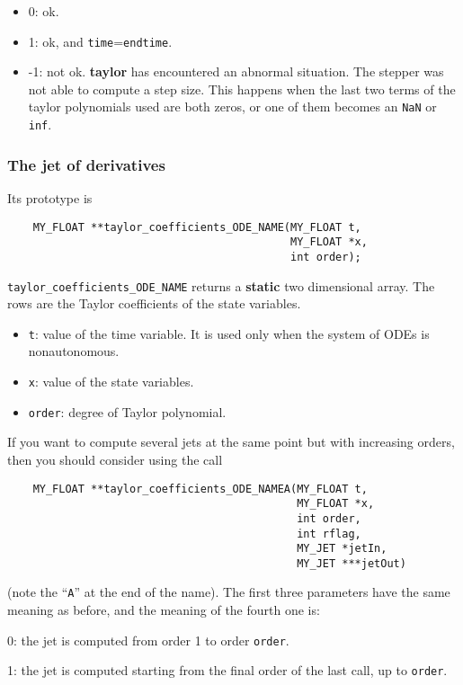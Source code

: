 \documentclass[10pt]{article}
\theoremstyle{remark}
\newcommand{\taylorname}{{\bf taylor}}
\begin{document}
\begin{itemize}
\item 0: ok.
\item 1: ok, and {\tt time}={\tt endtime}.
\item -1: not ok. \taylorname{} has encountered an abnormal situation. The stepper was not able to compute a step size. This happens when the last two terms of the taylor polynomials used are both zeros, or one of them becomes an \verb+NaN+ or \verb+inf+.
\end{itemize}


\subsubsection*{The jet of derivatives}
Its prototype is
\begin{verbatim}
    MY_FLOAT **taylor_coefficients_ODE_NAME(MY_FLOAT t,
                                            MY_FLOAT *x,
                                            int order);
\end{verbatim}
\verb+taylor_coefficients_ODE_NAME+ returns a {\bf static} two
dimensional array. The rows are the Taylor coefficients of the state
variables.

\vspace{3mm}
\begin{itemize}
  \item{\verb+t+: value of the time variable. It is used only when the
    system of ODEs is nonautonomous.}
  \item{\verb+x+: value of the state variables.}
  \item{\verb+order+: degree of Taylor polynomial.}
\end{itemize}

If you want to compute several jets at the same point but with
increasing orders, then you should consider using the call
\begin{verbatim}
    MY_FLOAT **taylor_coefficients_ODE_NAMEA(MY_FLOAT t,
                                             MY_FLOAT *x,
                                             int order,
                                             int rflag,
                                             MY_JET *jetIn, 
                                             MY_JET ***jetOut)
\end{verbatim}
(note the ``{\tt A}'' at the end of the name). The first three
parameters have the same meaning as before, and the meaning of the
fourth one is:
\begin{description}
  \item 0: the jet is computed from order 1 to order {\tt order}.
  \item 1: the jet is computed starting from the final order of the
    last call, up to {\tt order}.
\end{description}
\end{document}
